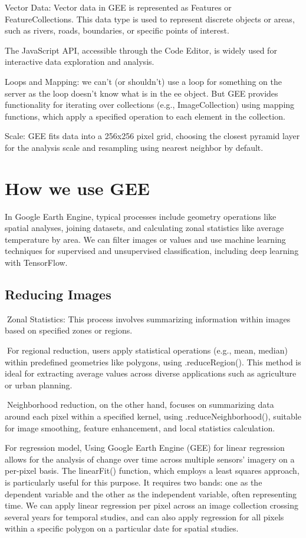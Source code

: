 \documentclass[
  letterpaper,
  DIV=11,
  numbers=noendperiod]{scrreprt}
\begin{document}
Vector Data: Vector data in GEE is represented as Features or
FeatureCollections. This data type is used to represent discrete objects
or areas, such as rivers, roads, boundaries, or specific points of
interest.

The JavaScript API, accessible through the Code Editor, is widely used
for interactive data exploration and analysis.

Loops and Mapping: we can't (or shouldn't) use a loop for something on
the server as the loop doesn't know what is in the ee object. But GEE
provides functionality for iterating over collections (e.g.,
ImageCollection) using mapping functions, which apply a specified
operation to each element in the collection.

Scale: GEE fits data into a 256x256 pixel grid, choosing the closest
pyramid layer for the analysis scale and resampling using nearest
neighbor by default.

\section{How we use GEE}\label{how-we-use-gee}

In Google Earth Engine, typical processes include geometry operations
like spatial analyses, joining datasets, and calculating zonal
statistics like average temperature by area. We can filter images or
values and use machine learning techniques for supervised and
unsupervised classification, including deep learning with TensorFlow.

\subsection{Reducing Images}\label{reducing-images}

Zonal Statistics: This process involves summarizing information within
images based on specified zones or regions.

For regional reduction, users apply statistical operations (e.g., mean,
median) within predefined geometries like polygons, using
.reduceRegion(). This method is ideal for extracting average values
across diverse applications such as agriculture or urban planning.

Neighborhood reduction, on the other hand, focuses on summarizing data
around each pixel within a specified kernel, using
.reduceNeighborhood(), suitable for image smoothing, feature
enhancement, and local statistics calculation.

For regression model, Using Google Earth Engine (GEE) for linear
regression allows for the analysis of change over time across multiple
sensors' imagery on a per-pixel basis. The linearFit() function, which
employs a least squares approach, is particularly useful for this
purpose. It requires two bands: one as the dependent variable and the
other as the independent variable, often representing time. We can apply
linear regression per pixel across an image collection crossing several
years for temporal studies, and can also apply regression for all pixels
within a specific polygon on a particular date for spatial studies.
\end{document}
